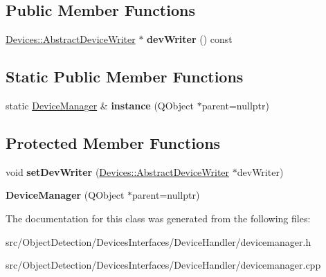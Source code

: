 \subsection*{Public Member Functions}
\begin{DoxyCompactItemize}
\item 
\mbox{\label{class_devices_1_1_device_manager_a3d3d30f8dae34a982aa1f5cce1ed49f5}} 
\hyperlink{class_devices_1_1_abstract_device_writer}{Devices\+::\+Abstract\+Device\+Writer} $\ast$ {\bfseries dev\+Writer} () const
\end{DoxyCompactItemize}
\subsection*{Static Public Member Functions}
\begin{DoxyCompactItemize}
\item 
\mbox{\label{class_devices_1_1_device_manager_ae8d81387e08e66e0f3c1d1d60aa8357f}} 
static \hyperlink{class_devices_1_1_device_manager}{Device\+Manager} \& {\bfseries instance} (Q\+Object $\ast$parent=nullptr)
\end{DoxyCompactItemize}
\subsection*{Protected Member Functions}
\begin{DoxyCompactItemize}
\item 
\mbox{\label{class_devices_1_1_device_manager_a546ce7493ea49bbadf782fa338fd24c4}} 
void {\bfseries set\+Dev\+Writer} (\hyperlink{class_devices_1_1_abstract_device_writer}{Devices\+::\+Abstract\+Device\+Writer} $\ast$dev\+Writer)
\item 
\mbox{\label{class_devices_1_1_device_manager_ae71ec0ba8dac9215cf6c79fb1800e006}} 
{\bfseries Device\+Manager} (Q\+Object $\ast$parent=nullptr)
\end{DoxyCompactItemize}


The documentation for this class was generated from the following files\+:\begin{DoxyCompactItemize}
\item 
src/\+Object\+Detection/\+Devices\+Interfaces/\+Device\+Handler/devicemanager.\+h\item 
src/\+Object\+Detection/\+Devices\+Interfaces/\+Device\+Handler/devicemanager.\+cpp\end{DoxyCompactItemize}
